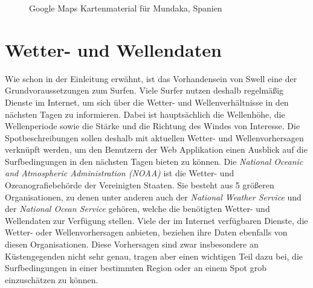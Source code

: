\begin{figure}[h]
  \caption{Google Maps Kartenmaterial für Mundaka, Spanien}
  \label{google-maps}
\end{figure}

\section{Wetter- und Wellendaten}
\label{sec:Wetter- und Wellendaten}

Wie schon in der Einleitung erwähnt, ist das Vorhandensein von Swell
eine der Grundvoraussetzungen zum Surfen. Viele Surfer nutzen deshalb
regelmäßig Dienste im Internet, um sich über die Wetter- und
Wellenverhältnisse in den nächsten Tagen zu informieren. Dabei ist
hauptsächlich die Wellenhöhe, die Wellenperiode sowie die Stärke und
die Richtung des Windes von Interesse. Die Spotbeschreibungen sollen
deshalb mit aktuellen Wetter- und Wellenvorhersagen verknüpft werden,
um den Benutzern der Web Applikation einen Ausblick auf die
Surfbedingungen in den nächsten Tagen bieten zu können. Die
\textit{National Oceanic and Atmospheric Administration (NOAA)} ist
die Wetter- und Ozeanografiebehörde der Vereinigten Staaten. Sie
besteht aus 5 größeren Organisationen, zu denen unter anderen auch der
\textit{National Weather Service} und der \textit{National Ocean
  Service} gehören, welche die benötigten Wetter- und Wellendaten zur
Verfügung stellen. Viele der im Internet verfügbaren Dienste, die
Wetter- oder Wellenvorhersagen anbieten, beziehen ihre Daten ebenfalls
von diesen Organisationen. Diese Vorhersagen sind zwar insbesondere an
Küstengegenden nicht sehr genau, tragen aber einen wichtigen Teil dazu
bei, die Surfbedingungen in einer bestimmten Region oder an einem Spot
grob einzuschätzen zu können.


